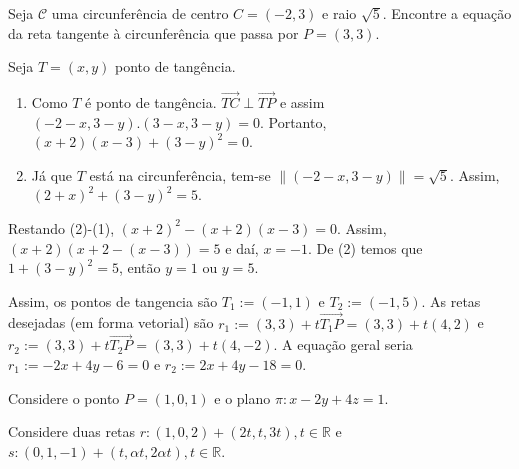 \documentclass[11pt]{exam}
\begin{document}
\begin{questions}
\begin{solution}
   \end{solution}
 \question[20] Seja $\mathcal{C}$ uma circunferência de centro 
 $C=(-2,3)$ e raio $\sqrt{5}$. Encontre a equação da reta tangente à circunferência que passa por $P=(3,3)$. 
   \begin{solution}
   Seja $T=(x,y)$ ponto de tangência. 
    \begin{enumerate}
    \item Como $T$ é ponto de tangência. 
    $\overrightarrow{TC} \perp \overrightarrow{TP}$ e
    assim $(-2-x, 3-y).(3-x,3-y)=0$. Portanto, $(x+2)(x-3)+(3-y)^{2}=0$. 
    \item Já que $T$ está na circunferência, tem-se $\|(-2-x, 3-y)\|=\sqrt{5}$. Assim, $(2+x)^{2}+(3-y)^{2}=5$.
    \end{enumerate}
   Restando (2)-(1), $(x+2)^{2}-(x+2)(x-3)=0$. Assim, $(x+2)(x+2-(x-3))=5$
   e daí, $x=-1$. De (2) temos que $1+(3-y)^{2}=5$, então $y=1$ ou $y=5$.
    
   Assim, os pontos de tangencia são $T_1:=(-1,1)$ e $T_{2}:=(-1,5)$.
   As retas desejadas (em forma vetorial) são 
   $r_1:=(3,3)+t\overrightarrow{T_{1}P}=(3,3)+t(4,2)$
   e     $r_2:=(3,3)+t\overrightarrow{T_2P}=(3,3)+t(4,-2)$. A equação geral seria 
   $r_{1}:=-2x+4y-6=0$ e  
   $r_{2}:=2x+4y-18=0$. 
   \end{solution}
 \question Considere o ponto $P=(1,0,1)$ e o plano $\pi: x-2y+4z=1$.
 \question Considere duas retas 
 $r: (1,0,2)+(2t,t,3t), t \in \mathbb{R}$ e
 $s: (0,1,-1)+(t,\alpha t, 2\alpha t), t \in \mathbb{R}$.
   \begin{parts}

\end{parts}
\end{questions}
\end{document}
